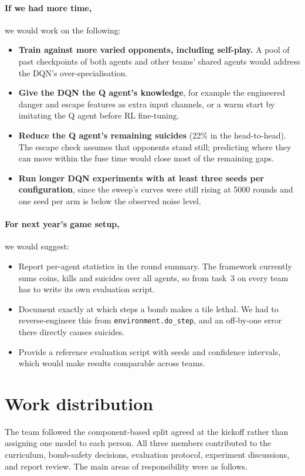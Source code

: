 \documentclass[11pt]{article}
\newcommand{\code}[1]{\texttt{#1}}
\begin{document}
\paragraph{If we had more time,} we would work on the following:
\begin{itemize}
  \item \textbf{Train against more varied opponents, including self-play.} A pool of past checkpoints of both agents and other teams' shared agents would address the DQN's over-specialisation.
  \item \textbf{Give the DQN the Q agent's knowledge}, for example the engineered danger and escape features as extra input channels, or a warm start by imitating the Q agent before RL fine-tuning.
  \item \textbf{Reduce the Q agent's remaining suicides} (22\% in the head-to-head). The escape check assumes that opponents stand still; predicting where they can move within the fuse time would close most of the remaining gaps.
  \item \textbf{Run longer DQN experiments with at least three seeds per configuration}, since the sweep's curves were still rising at 5000 rounds and one seed per arm is below the observed noise level.
\end{itemize}

\paragraph{For next year's game setup,} we would suggest:
\begin{itemize}
  \item Report per-agent statistics in the round summary. The framework currently sums coins, kills and suicides over all agents, so from task~3 on every team has to write its own evaluation script.
  \item Document exactly at which steps a bomb makes a tile lethal. We had to reverse-engineer this from \code{environment.do\_step}, and an off-by-one error there directly causes suicides.
  \item Provide a reference evaluation script with seeds and confidence intervals, which would make results comparable across teams.
\end{itemize}

\section*{Work distribution}
The team followed the component-based split agreed at the kickoff rather than assigning
one model to each person. All three members contributed to the curriculum, bomb-safety
decisions, evaluation protocol, experiment discussions, and report review. The main areas
of responsibility were as follows.
\end{document}
